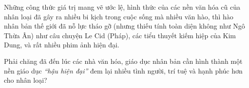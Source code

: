 Những công thức giá trị mang vẽ ước lệ, hình thức của các nền văn hóa cũ của nhân loại đã gây ra nhiều bi kịch trong cuộc sống mà nhiều văn hào, thì hào nhân bản thế giới đã nỗ lực tháo gỡ (nhưng thiếu tính toàn diện không như Ngô Thừa Ân) như câu chuyện Le Cid (Pháp), các tiểu thuyết kiếm hiệp của Kim Dung, và rất nhiều phim ảnh hiện đại.

Phải chăng đã đến lúc các nhà văn hóa, giáo dục nhân bản cần hình thành một nền giáo dục \emph{``hậu hiện đại''} đem lại nhiều tình người, trí tuệ và hạnh phúc hơn cho nhân loại?
